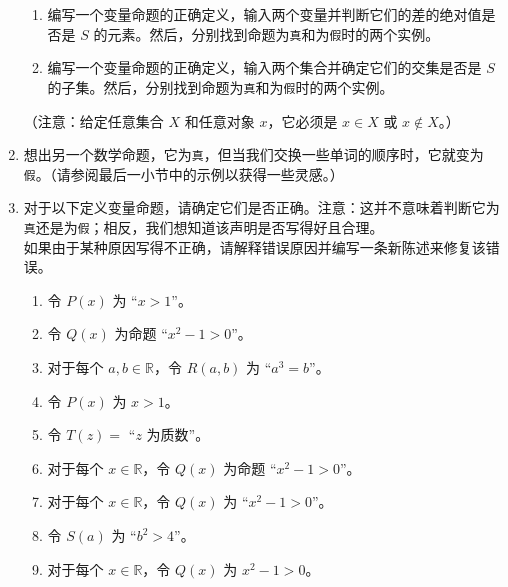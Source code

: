 \begin{enumerate}[label=(\arabic*)]
\begin{enumerate}[label=(\alph*)]
            \item 编写一个变量命题的正确定义，输入两个变量并判断它们的差的绝对值是否是 $S$ 的元素。然后，分别找到命题为\verb|真|和为\verb|假|时的两个实例。
            \item 编写一个变量命题的正确定义，输入两个集合并确定它们的交集是否是 $S$ 的子集。然后，分别找到命题为\verb|真|和为\verb|假|时的两个实例。
        \end{enumerate}
        （注意：给定任意集合 $X$ 和任意对象 $x$，它必须是 $x \in X$ 或 $x \notin X$。）
    \item 想出另一个数学命题，它为\verb|真|，但当我们交换一些单词的顺序时，它就变为\verb|假|。（请参阅最后一小节中的示例以获得一些灵感。）
    \item 对于以下定义变量命题，请确定它们是否正确。注意：这并不意味着判断它为\verb|真|还是为\verb|假|；相反，我们想知道该声明是否写得好且合理。\\
    如果由于某种原因写得不正确，请解释错误原因并编写一条新陈述来修复该错误。
    \begin{enumerate}[label=(\alph*)]
        \item 令 $P(x)$ 为 ``$x > 1$''。
        \item 令 $Q(x)$ 为命题 ``$x^2 - 1 > 0$''。
        \item 对于每个 $a,b \in \mathbb{R}$，令 $R(a, b)$ 为 ``$a^3 = b$''。
        \item 令 $P(x)$ 为 $x > 1$。
        \item 令 $T(z) = $ ``$z$ 为质数''。
        \item 对于每个 $x \in \mathbb{R}$，令 $Q(x)$ 为命题 ``$x^2 - 1 > 0$''。
        \item 对于每个 $x \in \mathbb{R}$，令 $Q(x)$ 为 ``$x^2 - 1 > 0$''。
        \item 令 $S(a)$ 为 ``$b^2 > 4$''。
        \item 对于每个 $x \in \mathbb{R}$，令 $Q(x)$ 为 $x^2 - 1 > 0$。
    \end{enumerate}
\end{enumerate}
